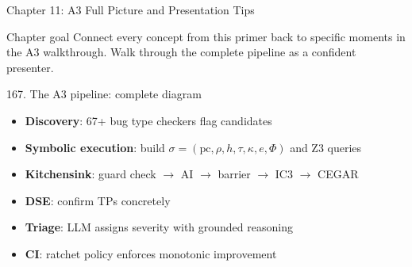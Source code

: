 \documentclass[aspectratio=169]{beamer}
\begin{document}
\begin{frame}{Chapter 11: A3 Full Picture and Presentation Tips}
\begin{block}{Chapter goal}
Connect every concept from this primer back to specific moments in the A3 walkthrough.
Walk through the complete pipeline as a confident presenter.
\end{block}
\end{frame}

\begin{frame}[shrink=20]{167. The A3 pipeline: complete diagram}
\begin{center}
%
\end{center}
\begin{itemize}
  \item \textbf{Discovery}: 67+ bug type checkers flag candidates
  \item \textbf{Symbolic execution}: build \(\sigma = (\text{pc}, \rho, h, \tau, \kappa, e, \Phi)\) and Z3 queries
  \item \textbf{Kitchensink}: guard check $\to$ AI $\to$ barrier $\to$ IC3 $\to$ CEGAR
  \item \textbf{DSE}: confirm TPs concretely
  \item \textbf{Triage}: LLM assigns severity with grounded reasoning
  \item \textbf{CI}: ratchet policy enforces monotonic improvement
\end{itemize}
\end{frame}
\end{document}
